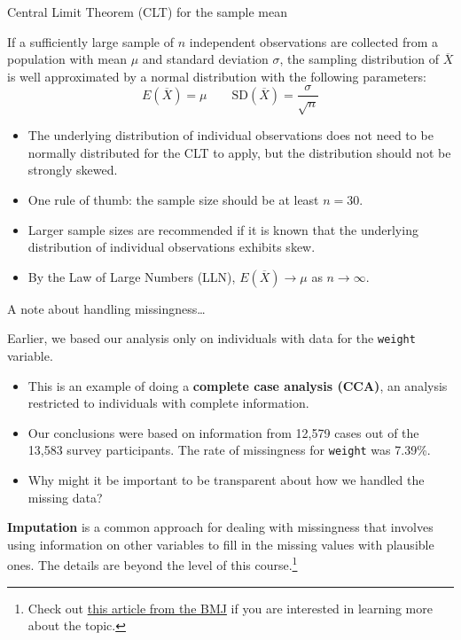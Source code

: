 \documentclass[
  ignorenonframetext,
  aspectratio=169]{beamer}
\begin{document}
\begin{frame}{Central Limit Theorem (CLT) for the sample mean}
\protect\hypertarget{central-limit-theorem-clt-for-the-sample-mean}{}
\small

If a sufficiently large sample of \(n\) independent observations are
collected from a population with mean \(\mu\) and standard deviation
\(\sigma\), the sampling distribution of \(\overline{X}\) is well
approximated by a normal distribution with the following parameters:
\[E(\overline{X}) = \mu \qquad \text{SD}(\overline{X}) = \frac{\sigma}{\sqrt{n}} \]

\begin{itemize}
\item
  The underlying distribution of individual observations does not need
  to be normally distributed for the CLT to apply, but the distribution
  should not be strongly skewed.
\item
  One rule of thumb: the sample size should be at least \(n = 30\).
\item
  Larger sample sizes are recommended if it is known that the underlying
  distribution of individual observations exhibits skew.
\item
  By the Law of Large Numbers (LLN), \(E(\overline{X}) \rightarrow \mu\)
  as \(n \rightarrow \infty\).
\end{itemize}
\end{frame}

\begin{frame}{A note about handling missingness\ldots{}}
\protect\hypertarget{a-note-about-handling-missingness}{}
\small

Earlier, we based our analysis only on individuals with data for the
\texttt{weight} variable.

\begin{itemize}
\item
  This is an example of doing a \textbf{complete case analysis (CCA)},
  an analysis restricted to individuals with complete information.
\item
  Our conclusions were based on information from 12,579 cases out of the
  13,583 survey participants. The rate of missingness for
  \texttt{weight} was 7.39\%.
\item
  Why might it be important to be transparent about how we handled the
  missing data?
\end{itemize}

\textbf{Imputation} is a common approach for dealing with missingness
that involves using information on other variables to fill in the
missing values with plausible ones. The details are beyond the level of
this
course.\footnote{Check out \textcolor{blue}{\href{https://www.bmj.com/content/338/bmj.b2393}{this article from the BMJ}} if you are interested in learning more about the topic.}
\end{frame}
\end{document}
